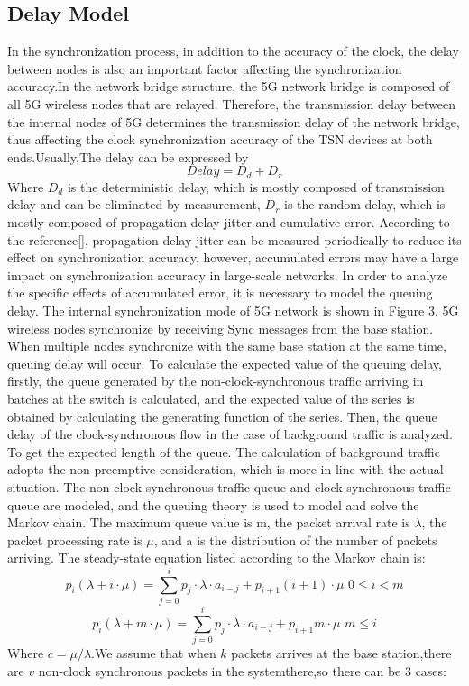 \documentclass[english]{cccconf}
\begin{document}
\subsection{Delay Model}
In the synchronization process, in addition to the accuracy of the clock, the delay between nodes is also an important factor affecting the synchronization accuracy.In the network bridge structure, the 5G network bridge is composed of all 5G wireless nodes that are relayed. Therefore, the transmission delay between the internal nodes of 5G determines the transmission delay of the network bridge, thus affecting the clock synchronization accuracy of the TSN devices at both ends.Usually,The delay can be expressed by
\begin{equation}
	Delay=D_d+D_r
\end{equation}
Where $D_d$ is the deterministic delay, which is mostly composed of transmission delay and can be eliminated by measurement, $D_r$ is the random delay, which is mostly composed of propagation delay jitter and cumulative error. According to the reference[], propagation delay jitter can be measured periodically to reduce its effect on synchronization accuracy, however, accumulated errors may have a large impact on synchronization accuracy in large-scale networks. In order to analyze the specific effects of accumulated error, it is necessary to model the queuing delay.
The internal synchronization mode of 5G network is shown in Figure 3. 5G wireless nodes synchronize by receiving Sync messages from the base station. When multiple nodes synchronize with the same base station at the same time, queuing delay will occur. To calculate the expected value of the queuing delay, firstly, the queue generated by the non-clock-synchronous traffic arriving in batches at the switch is calculated, and the expected value of the series is obtained by calculating the generating function of the series. Then, the queue delay of the clock-synchronous flow in the case of background traffic is analyzed. To get the expected length of the queue. The calculation of background traffic adopts the non-preemptive consideration, which is more in line with the actual situation. The non-clock synchronous traffic queue and clock synchronous traffic queue are modeled, and the queuing theory is used to model and solve the Markov chain. The maximum queue value is m, the packet arrival rate is $\lambda $, the packet processing rate is $\mu $, and a is the distribution of the number of packets arriving. The steady-state equation listed according to the Markov chain is:
\begin{equation}
	p_i\left( \lambda +i\cdot \mu \right) =\sum_{j=0}^i{p_j\cdot \lambda \cdot a_{i-j}+p_{i+1}\left( i+1 \right) \cdot \mu\,\, 0\leqslant i<m}
\end{equation}
\begin{equation}
		p_i\left( \lambda +m\cdot \mu \right) =\sum_{j=0}^i{p_j\cdot \lambda \cdot a_{i-j}+p_{i+1}m\cdot \mu}\,\, m\leqslant i
\end{equation}
Where $c=\mu/\lambda $.We assume that when $k$ packets arrives at the base station,there are $v$ non-clock synchronous packets in the systemthere,so there can be 3 cases:
\end{document}
